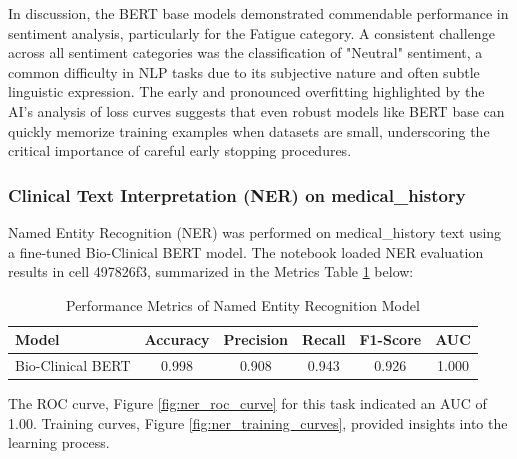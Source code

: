 In discussion, the BERT base models demonstrated commendable performance in sentiment analysis, particularly for the Fatigue category. A consistent challenge across all sentiment categories was the classification of "Neutral" sentiment, a common difficulty in NLP tasks due to its subjective nature and often subtle linguistic expression. The early and pronounced overfitting highlighted by the AI's analysis of loss curves suggests that even robust models like BERT base can quickly memorize training examples when datasets are small, underscoring the critical importance of careful early stopping procedures.

\subsubsection{Clinical Text Interpretation (NER) on medical\_history}

Named Entity Recognition (NER) was performed on medical\_history text using a fine-tuned Bio-Clinical BERT model. The notebook loaded NER evaluation results in cell 497826f3, summarized in the Metrics Table \ref{tab:ner_performance} below:

\begin{table}[htbp]
    \centering
    \caption{Performance Metrics of Named Entity Recognition Model}
    \label{tab:ner_performance}
    \begin{tabular}{lccccc}
        \hline
        \textbf{Model} & \textbf{Accuracy} & \textbf{Precision} & \textbf{Recall} & \textbf{F1-Score} & \textbf{AUC} \\
        \hline
        Bio-Clinical BERT & 0.998 & 0.908 & 0.943 & 0.926 & 1.000 \\
        \hline
    \end{tabular}
\end{table}

The ROC curve, Figure \ref{fig:ner_roc_curve} for this task indicated an AUC of 1.00. Training curves, Figure \ref{fig:ner_training_curves}, provided insights into the learning process.


